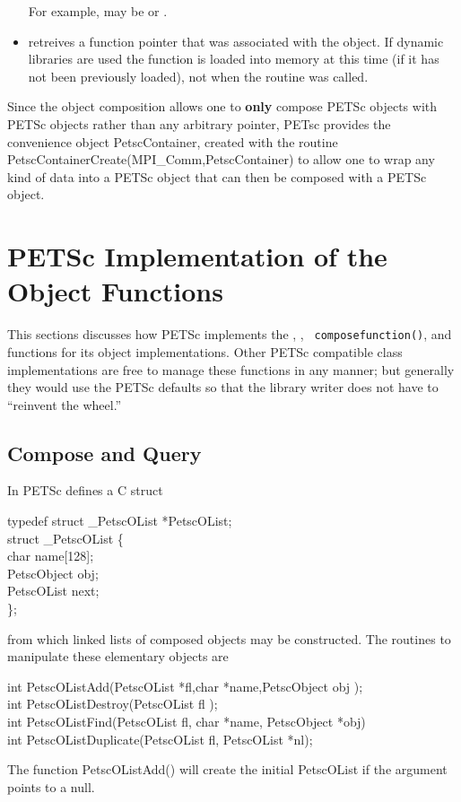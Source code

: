 \documentclass[twoside,12pt]{../sty/report_petsc}
\begin{document}
\begin{itemize}
      For example,  may be  or 
      .

\item {} retreives a function pointer that
      was associated with the object. If dynamic libraries are used the function is loaded
      into memory at this time (if it has not been previously loaded), not when the
       routine was called.

\end{itemize}

Since the object composition allows one to {\bf only} compose PETSc objects
with PETSc objects rather than any arbitrary pointer, PETsc provides
the convenience object PetscContainer, created with the
routine PetscContainerCreate(MPI\_Comm,PetscContainer)
to allow one to wrap any kind of data into a PETSc object that can then be
composed with a PETSc object.

\section{PETSc Implementation of the  Object Functions}

This sections discusses how PETSc implements the , , {\tt
composefunction()}, and  functions for its object implementations. 
Other PETSc compatible class implementations are free to manage these functions in any 
manner; but generally they would use the PETSc defaults so that the library writer does
not have to ``reinvent the wheel.''

\subsection{Compose and Query}

In  PETSc defines a C struct
\begin{tabbing}
typedef struct \_PetscOList *PetscOList;\\
struct \_PetscOList \{\\
    char        name[128];\\
    PetscObject obj;\\
    PetscOList  next;\\
\};
\end{tabbing}
from which linked lists of composed objects may be constructed. The routines
to manipulate these elementary objects are
\begin{tabbing}
  int PetscOListAdd(PetscOList *fl,char *name,PetscObject obj );\\
  int PetscOListDestroy(PetscOList fl );\\
  int PetscOListFind(PetscOList fl, char *name, PetscObject *obj)\\
  int PetscOListDuplicate(PetscOList fl, PetscOList *nl);
\end{tabbing}
The function PetscOListAdd() will create the initial PetscOList if the argument 
 points to a null.
\end{document}
